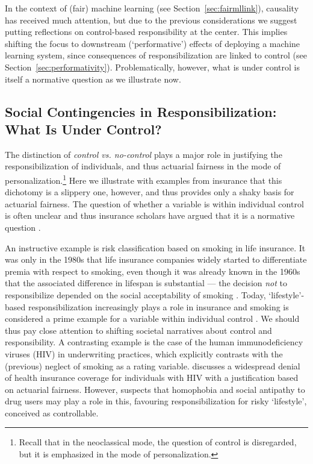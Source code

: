 \documentclass[11pt]{article} %
\begin{document}
In the context of (fair) machine learning (see Section~\ref{sec:fairmllink}), causality has received much attention, but due to the previous considerations we suggest putting reflections on control-based responsibility at the center. This implies shifting the focus to downstream (`performative') effects of deploying a machine learning system, since consequences of responsibilization are linked to control (see Section~\ref{sec:performativity}). Problematically, however, what is under control is itself a normative question as we illustrate now.



\subsection{Social Contingencies in Responsibilization: What Is Under Control?}
\label{sec:contingencies}
The distinction of \textit{control vs. no-control} plays a major role in justifying the responsibilization of individuals, and thus actuarial fairness in the mode of personalization.\footnote{Recall that in the neoclassical mode, the question of control is disregarded, but it is emphasized in the mode of personalization.} Here we illustrate with examples from insurance that this dichotomy is a slippery one, however, and thus provides only a shaky basis for actuarial fairness. The question of whether a variable is within individual control is often unclear and thus insurance scholars have argued that it is a normative question \citep{abraham1985efficiency,gaulding1994race}. 


An instructive example is risk classification based on smoking in life insurance. It was only in the 1980s that life insurance companies widely started to differentiate premia with respect to smoking, even though it was already known in the 1960s that the associated difference in lifespan is substantial --- the decision \textit{not} to responsibilize depended on the social acceptability of smoking \citep{wilkie1997mutuality,glenn2003risk}. Today, `lifestyle'-based responsibilization increasingly plays a role in insurance and smoking is considered a prime example for a variable within individual control \citep{van2006making,van2007genetic}. We should thus pay close attention to shifting societal narratives about control and responsibility.
A contrasting example is the case of the human immunodeficiency viruses (HIV) in underwriting practices, which \citet{daniels1990insurability} explicitly contrasts with the (previous) neglect of smoking as a rating variable. \citet{daniels1990insurability} discusses a widespread denial of health insurance coverage for individuals with HIV with a justification based on actuarial fairness. However, \citet{daniels1990insurability} suspects that homophobia and social antipathy to drug users may play a role in this, favouring responsibilization for risky `lifestyle', conceived as controllable.
\end{document}
